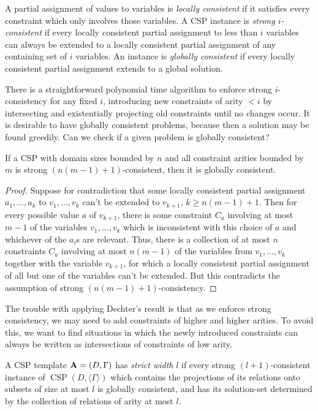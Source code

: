 \documentclass[letterpaper,11pt]{article}
\DeclareMathOperator{\CSP}{CSP}
\begin{document}
\begin{defn} A partial assignment of values to variables is \emph{locally consistent} if it satisfies every constraint which only involves those variables. A CSP instance is \emph{strong $i$-consistent} if every locally consistent partial assignment to less than $i$ variables can always be extended to a locally consistent partial assignment of any containing set of $i$ variables. An instance is \emph{globally consistent} if every locally consistent partial assignment extends to a global solution.
\end{defn}

There is a straightforward polynomial time algorithm to enforce strong $i$-consistency for any fixed $i$, introducing new constraints of arity $< i$ by intersecting and existentially projecting old constraints until no changes occur. It is desirable to have globally consistent problems, because then a solution may be found greedily. Can we check if a given problem is globally consistent?

\begin{thm} If a CSP with domain sizes bounded by $n$ and all constraint arities bounded by $m$ is strong $(n(m-1)+1)$-consistent, then it is globally consistent.
\end{thm}
\begin{proof} Suppose for contradiction that some locally consistent partial assignment $a_1, ..., a_k$ to $v_1, ..., v_k$ can't be extended to $v_{k+1}$, $k \ge n(m-1)+1$. Then for every possible value $a$ of $v_{k+1}$, there is some constraint $C_a$ involving at most $m-1$ of the variables $v_1, ..., v_k$ which is inconsistent with this choice of $a$ and whichever of the $a_i$s are relevant. Thus, there is a collection of at most $n$ constraints $C_a$ involving at most $n(m-1)$ of the variables from $v_1, ..., v_k$ together with the variable $v_{k+1}$, for which a locally consistent partial assignment of all but one of the variables can't be extended. But this contradicts the assumption of strong $(n(m-1)+1)$-consistency.
\end{proof}

The trouble with applying Dechter's result is that as we enforce strong consistency, we may need to add constraints of higher and higher arities. To avoid this, we want to find situations in which the newly introduced constraints can always be written as intersections of constraints of low arity.

\begin{defn} A CSP template $\mathbf{A} = (D, \Gamma)$ has \emph{strict width} $l$ if every strong $(l+1)$-consistent instance of $\CSP(D, \langle \Gamma \rangle)$ which contains the projections of its relations onto subsets of size at most $l$ is globally consistent, and has its solution-set determined by the collection of relations of arity at most $l$.%
\end{defn}
\end{document}
